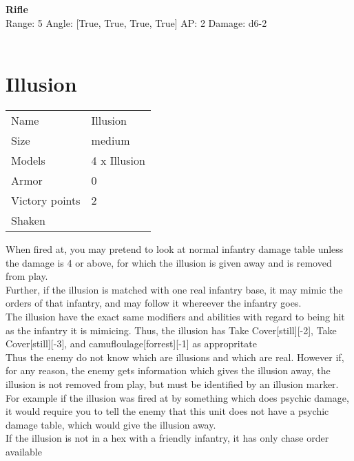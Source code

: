 \ \\

\ \\
{\bf Rifle } \\



Range: 5  Angle: [True, True, True, True] AP: 2 Damage: d6-2 \\




 
\ \\














\pagebreak\clearpage

\section{ Illusion }

\begin{tabular}{ll}
  Name & Illusion \\
  Size & medium\\
  Models & 4 x Illusion\\
  Armor & 0\\
  Victory points & 2\\
  Shaken & \\
\end{tabular}

When fired at, you may pretend to look at normal infantry damage table unless the damage is 4 or above, for which the illusion is given away and is removed from play.\\ 
Further, if the illusion is matched with one real infantry base, it may mimic the orders of that infantry, and may follow it whereever the infantry goes.\\ 
The illusion have the exact same modifiers and abilities with regard to being hit as the infantry it is mimicing. Thus, the illusion has Take Cover[still][-2], Take Cover[still][-3], and camufloulage[forrest][-1] as appropritate \\ 
 Thus the enemy do not know which are illusions and which are real. However if, for any reason, the enemy gets information which gives the illusion away, the illusion is not removed from play, but must be identified by an illusion marker. For example if the illusion was fired at by something which does psychic damage, it would require you to tell the enemy that this unit does not have a psychic damage table, which would give the illusion away.\\ 
If the illusion is not in a hex with a friendly infantry, it has only chase order available\\ 




